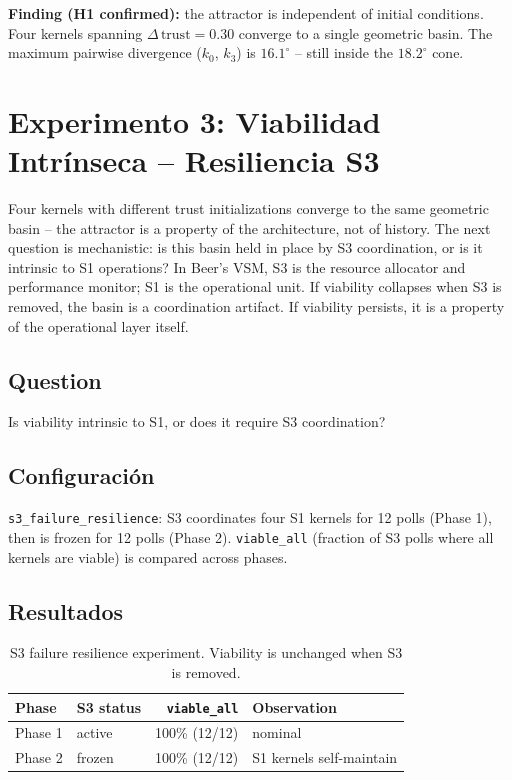 \documentclass[11pt, a4paper]{article}
\begin{document}
\textbf{Finding (H1 confirmed):} the attractor is independent of initial
conditions.
Four kernels spanning $\Delta\,\text{trust} = 0.30$ converge to a single
geometric basin.
The maximum pairwise divergence ($k_0$, $k_3$) is $16.1^\circ$ -- still inside
the $18.2^\circ$ cone.


\section{Experimento 3: Viabilidad Intrínseca -- Resiliencia S3}
\label{sec:resilience}

Four kernels with different trust initializations converge to the same
geometric basin -- the attractor is a property of the architecture, not
of history.
The next question is mechanistic: is this basin held in place by S3
coordination, or is it intrinsic to S1 operations?
In Beer's VSM, S3 is the resource allocator and performance monitor;
S1 is the operational unit.
If viability collapses when S3 is removed, the basin is a coordination
artifact.
If viability persists, it is a property of the operational layer itself.

\subsection*{Question} Is viability intrinsic to S1, or does it require
S3 coordination?

\subsection{Configuración}

\texttt{s3\_failure\_resilience}: S3 coordinates four S1 kernels for 12 polls
(Phase 1), then is frozen for 12 polls (Phase 2).
\texttt{viable\_all} (fraction of S3 polls where all kernels are viable) is
compared across phases.

\subsection{Resultados}

\begin{table}[h]
\centering
\begin{tabular}{llrl}
\toprule
Phase & S3 status & \texttt{viable\_all} & Observation \\
\midrule
Phase 1 & active & 100\% (12/12) & nominal \\
Phase 2 & frozen & 100\% (12/12) & S1 kernels self-maintain \\
\bottomrule
\end{tabular}
\caption{S3 failure resilience experiment.
Viability is unchanged when S3 is removed.}
\label{tab:resilience}
\end{table}
\end{document}
